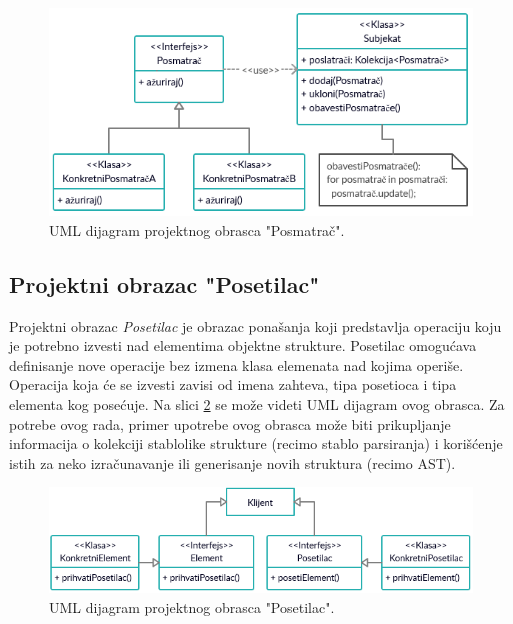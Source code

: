 \begin{figure}[h!]
\centering
\includegraphics[scale=0.7]{images/design_observer.png}
\caption{UML dijagram projektnog obrasca "Posmatrač".}
\label{fig:UMLObserver}
\end{figure}

\subsection{Projektni obrazac "Posetilac"}
\label{subsec:DesignPatternsListener}

Projektni obrazac \emph{Posetilac} je obrazac ponašanja koji predstavlja operaciju koju je potrebno izvesti nad elementima objektne strukture. Posetilac omogućava definisanje nove operacije bez izmena klasa elemenata nad kojima operiše. Operacija koja će se izvesti zavisi od imena zahteva, tipa posetioca i tipa elementa kog posećuje. Na slici \ref{fig:UMLVisitor} se može videti UML dijagram \cite{UML} ovog obrasca. Za potrebe ovog rada, primer upotrebe ovog obrasca može biti prikupljanje informacija o kolekciji stablolike strukture (recimo stablo parsiranja) i korišćenje istih za neko izračunavanje ili generisanje novih struktura (recimo AST). 

\begin{figure}[h!]
    \centering
    \includegraphics[scale=0.7]{images/design_visitor.png}
    \caption{UML dijagram projektnog obrasca "Posetilac".} 
    \label{fig:UMLVisitor}
\end{figure}
